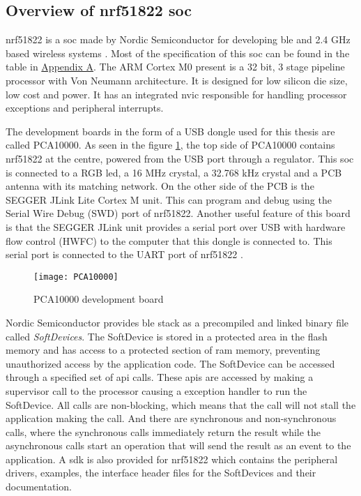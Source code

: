 \subsection{Overview of nrf51822 \gls{soc}}

nrf51822 is a \gls{soc} made by Nordic Semiconductor for developing \gls{ble} and 2.4 GHz based wireless systems \cite{nrf51822page}. Most of the specification of this \gls{soc} can be found in the table in \hyperref[AppendixA]{Appendix A}. The ARM Cortex M0 present is a 32 bit, 3 stage pipeline processor with Von Neumann architecture. It is designed for low silicon die size, low cost and power. It has an integrated \gls{nvic}  responsible for handling processor exceptions and peripheral interrupts. 

The development boards in the form of a USB dongle used for this thesis are called PCA10000. As seen in the figure \ref{pca10000}, the top side of PCA10000 contains nrf51822 at the centre, powered from the USB port through a regulator. This \gls{soc} is connected to a RGB led, a 16 MHz crystal, a 32.768  kHz crystal and a PCB antenna with its matching network. On the other side of the PCB is the SEGGER JLink Lite Cortex M unit. This can program and debug using the Serial Wire Debug (SWD) port of nrf51822. Another useful feature of this board is that the SEGGER JLink unit provides a serial port over USB with hardware flow control (HWFC) to the computer that this dongle is connected to. This serial port is connected to the UART port of nrf51822 \cite{PrithviR}.

\begin{figure}[h]
\texttt{[image: PCA10000]}
\caption{PCA10000 development board}
\label{pca10000}
\end{figure} 

Nordic Semiconductor provides \gls{ble} stack as a precompiled and linked binary file called \emph{SoftDevices}. The SoftDevice is stored in a protected area in the flash memory and has access to a protected section of \gls{ram} memory, preventing unauthorized access by the application code. The SoftDevice can be accessed through a specified set of \gls{api} calls. These \glspl{api} are accessed by making a supervisor call to the processor causing a exception handler to run the SoftDevice. All calls are non-blocking, which means that the call will not stall the application making the call. And there are synchronous and non-synchronous calls, where the synchronous calls immediately return the result while the asynchronous calls start an operation that will send the result as an event to the application. A \gls{sdk} is also provided for nrf51822 which contains the peripheral drivers, examples, the interface header files for the SoftDevices and their documentation.
 


